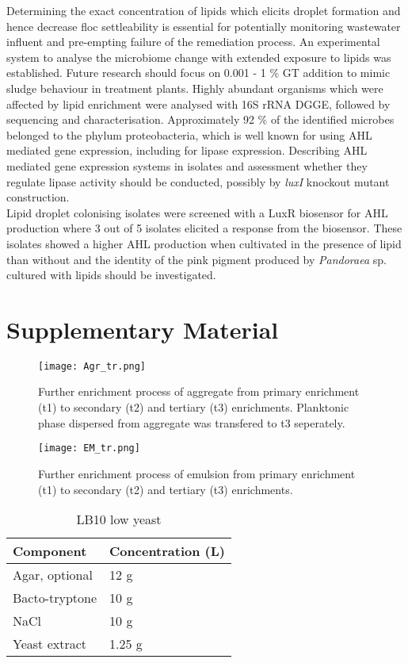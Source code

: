 \documentclass[twoside]{article}
\begin{document}
Determining the exact concentration of lipids which elicits droplet formation and hence decrease floc settleability is essential for potentially monitoring wastewater influent and pre-empting failure of the remediation process. An experimental system to analyse the microbiome change with extended exposure to lipids was established. Future research should focus on 0.001 - 1 \% GT addition to mimic sludge behaviour in treatment plants. Highly abundant organisms which were affected by lipid enrichment were analysed with 16S rRNA DGGE, followed by sequencing and characterisation. Approximately 92 \% of the identified microbes belonged to the phylum proteobacteria, which is well known for using AHL mediated gene expression, including for lipase expression. Describing AHL mediated gene expression systems in isolates and assessment whether they regulate lipase activity should be conducted, possibly by \emph{luxI} knockout mutant construction.\\

Lipid droplet colonising isolates were screened with a LuxR biosensor for AHL production where 3 out of 5 isolates elicited a response from the biosensor. These isolates showed a higher AHL production when cultivated in the presence of lipid than without and the identity of the pink pigment produced by \emph{Pandoraea} sp. cultured with lipids should be investigated.
\newpage 
\thispagestyle{plain}



\newpage 
\FloatBarrier
\section{Supplementary Material}
\begin{figure}
\texttt{[image: Agr\_tr.png]}
\caption{Further enrichment process of aggregate from primary enrichment (t1) to secondary (t2) and tertiary (t3) enrichments. Planktonic phase dispersed from aggregate was transfered to t3 seperately.}
\end{figure}
\begin{figure}
\texttt{[image: EM\_tr.png]}
\caption{Further enrichment process of emulsion from primary enrichment (t1) to secondary (t2) and tertiary (t3) enrichments.}
\end{figure}

\FloatBarrier
\begin{table}
\caption{LB10 low yeast}
\begin{tabular}{  p{6.9cm} | p{6.9cm} }
\hline
Component & Concentration (L) \\
\hline
 Agar, optional & 12 g  \\
Bacto-tryptone    & 10 g  \\
   NaCl   & 10 g  \\
    Yeast extract    & 1.25 g \\
  \hline
\end{tabular}
\end{table}
\end{document}
